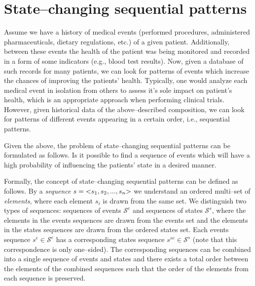 \documentclass[runningheads,a4paper]{llncs}
\begin{document}
\section{State--changing sequential patterns}
\label{sec:main}
Assume we have a history of medical events (performed procedures, administered pharmaceuticals, dietary regulations, etc.) of a given patient.
Additionally, between these events the health of the patient was being monitored and recorded in a form of some indicators (e.g., blood test results).
Now, given a database of such records for many patients, we can look for patterns of events which increase the chances of improving the patients' health.
Typically, one would analyze each medical event in isolation from others to assess it's sole impact on patient's health, which is an appropriate approach when performing clinical trials.
However, given historical data of the above--described composition, we can look for patterns of different events appearing in a certain order, i.e., sequential patterns.

Given the above, the problem of state--changing sequential patterns can be formulated as follows.
Is it possible to find a sequence of events which will have a high probability of influencing the patients' state in a desired manner.

Formally, the concept of state--changing sequential patterns can be defined as follows.
By a \textit{sequence} $s=\text{\textless} s_1, s_2, ..., s_n\text{\textgreater}$ we understand an ordered multi--set of \textit{elements}, where each element $s_i$ is drawn from the same set.
We distinguish two types of sequences: sequences of events $\mathcal{S}^e$ and sequences of states $\mathcal{S}^s$, where the elements in the events sequences are drawn from the events set and the elements in the states sequences are drawn from the ordered states set.
Each events sequence $s^e\in\mathcal{S}^e$ has a corresponding states sequence $s^{se}\in\mathcal{S}^s$ (note that this correspondence is only one--sided).
The corresponding sequences can be combined into a single sequence of events and states and there exists a total order between the elements of the combined sequences such that the order of the elements from each sequence is preserved.
\end{document}
